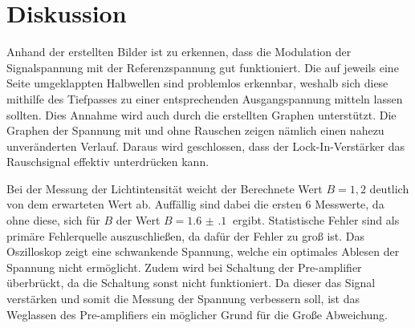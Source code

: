 \section{Diskussion}
\label{sec:Diskussion}



Anhand der erstellten Bilder ist zu erkennen, dass die Modulation der Signalspannung mit der Referenzspannung gut funktioniert.
Die auf jeweils eine Seite umgeklappten Halbwellen sind problemlos erkennbar, weshalb sich diese mithilfe des
Tiefpasses zu einer entsprechenden Ausgangspannung mitteln lassen sollten. Dies Annahme wird auch durch die erstellten
Graphen unterstützt.
Die Graphen der Spannung mit und ohne Rauschen zeigen nämlich einen nahezu unveränderten Verlauf. Daraus wird geschlossen, dass der
Lock-In-Verstärker das Rauschsignal effektiv unterdrücken kann.

Bei der Messung der Lichtintensität weicht der Berechnete Wert $B=1,2$ deutlich von dem erwarteten Wert ab. Auffällig sind dabei
die ersten 6 Messwerte, da ohne diese, sich für $B$ der Wert $B= \SI{1.6(1)}{}$ ergibt. Statistische Fehler sind
als primäre Fehlerquelle auszuschließen, da dafür der Fehler zu groß ist. Das Oszilloskop zeigt eine schwankende Spannung, welche
ein optimales Ablesen der Spannung nicht ermöglicht. Zudem wird bei Schaltung der Pre-amplifier überbrückt, da die Schaltung sonst nicht
funktioniert. Da dieser das Signal verstärken und somit die Messung der Spannung verbessern soll, ist das Weglassen des 
Pre-amplifiers ein möglicher Grund für die Große Abweichung.
